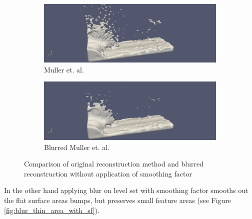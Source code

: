 \begin{figure}[H]
	\begin{center}
		\begin{subfigure}[b]{\textwidth}
			\includegraphics[width=\textwidth]{figures/DenvityBlurredSplashArea.png}
			\caption{Muller et. al.}
			\label{fig:denc_rec}
		\end{subfigure}
		\begin{subfigure}[b]{\textwidth}
			\includegraphics[width=\textwidth]{figures/DenvityBasedSplashArea.png}
			\caption{Blurred Muller et. al.}
			\label{fig:blur_w_o_sf}
		\end{subfigure}
	\end{center}
	\caption{Comparison of original reconstruction method and blurred reconstruction without application of smoothing factor}
	\label{fig:blur_thin_area}
\end{figure}
In the other hand applying blur on level set with smoothing factor smooths out the flat surface areas bumps, but preserves small feature areas (see Figure \ref{fig:blur_thin_area_with_sf}).
